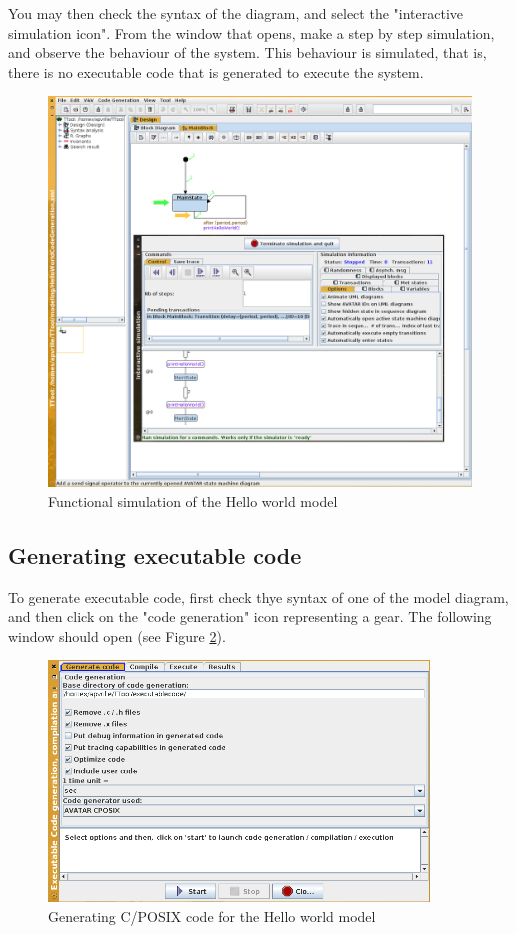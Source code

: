\documentclass[12pt]{article}
\begin{document}
You may then check the syntax of the diagram, and select the "interactive simulation icon". From the window that opens, make a step by step simulation, and observe the behaviour of the system. This behaviour is simulated, that is, there is no executable code that is generated to execute the system.

\begin{figure}[htbp]
\centering
\includegraphics[width=1\textwidth]{figures/simulationhelloworld}
\caption{Functional simulation of the Hello world model} \label{fig:simuhelloworld}
\end{figure}

\subsection{Generating executable code}
To generate executable code, first check thye syntax of one of the model diagram, and then click on the "code generation" icon representing a gear. The following window should open (see Figure \ref{fig:codegenhelloworld}).

\begin{figure}[htbp]
\centering
\includegraphics[width=0.9\textwidth]{figures/codegenhelloworld}
\caption{Generating C/POSIX code for the Hello world model} \label{fig:codegenhelloworld}
\end{figure}
\end{document}
